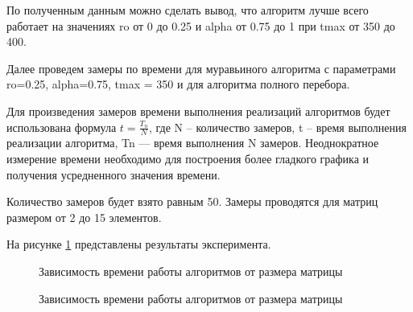 \newpage
По полученным данным можно сделать вывод, что алгоритм лучше всего работает на значениях ro от 0 до 0.25 и alpha от 0.75 до 1 при tmax от 350 до 400.

Далее проведем замеры по времени для муравьиного алгоритма с параметрами ro=0.25, alpha=0.75, tmax = 350 и для алгоритма полного перебора.

Для произведения замеров времени выполнения реализаций алгоритмов будет использована формула $t=\frac{T_{n}}{N}$, где N – количество замеров, t – время выполнения реализации алгоритма, Tn — время выполнения N замеров. Неоднократное измерение времени необходимо для построения более гладкого графика и получения усредненного значения времени.

Количество замеров будет взято равным 50. Замеры проводятся для матриц размером от 2 до 15 элементов.

На рисунке \ref{graphics} представлены результаты эксперимента.

\begin{figure}[h]
	\caption{Зависимость времени работы алгоритмов от размера матрицы}
	\label{graphics}
\end{figure}

\begin{figure}
	\caption{Зависимость времени работы алгоритмов от размера матрицы}
	\label{graphics2}
\end{figure}

